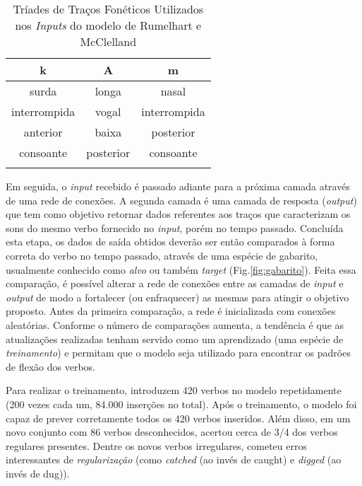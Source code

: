 \begin{table}[H]
\begin{center}
\begin{tabular}{ccc}
k                    & A                    & m                    \\ \hline
surda                & longa                & nasal                \\
interrompida         & vogal                & interrompida         \\
anterior             & baixa                & posterior            \\
consoante            & posterior            & consoante            \\
\multicolumn{1}{l}{} & \multicolumn{1}{l}{} & \multicolumn{1}{l}{}
\end{tabular}
\caption{Tríades de Traços Fonéticos Utilizados nos \textit{Inputs} do modelo de Rumelhart e McClelland}
\label{tab:trigrams}
\end{center}
\end{table}

Em seguida, o \textit{input} recebido é passado adiante para a próxima camada através de uma rede de conexões. A segunda camada é uma camada de resposta (\textit{output}) que tem como objetivo retornar dados referentes aos traços que caracterizam os sons do mesmo verbo fornecido no \textit{input}, porém no tempo passado. Concluída esta etapa, os dados de saída obtidos deverão ser então comparados à forma correta do verbo no tempo passado, através de uma espécie de gabarito, usualmente conhecido como \textit{alvo} ou também \textit{target} (Fig.\ref{fig:gabarito}). Feita essa comparação, é possível alterar a rede de conexões entre as camadas de \textit{input} e \textit{output} de modo a fortalecer (ou enfraquecer) as mesmas para atingir o objetivo proposto. Antes da primeira comparação, a rede é inicializada com conexões aleatórias. Conforme o número de comparações aumenta, a tendência é que as atualizações realizadas tenham servido como um aprendizado (uma espécie de \textit{treinamento}) e permitam que o modelo seja utilizado para encontrar os padrões de flexão dos verbos.



Para realizar o treinamento, \cite{rumelhart:1986} introduzem 420 verbos no modelo repetidamente (200 vezes cada um, 84.000 inserções no total).  Após o treinamento, o modelo foi capaz de prever corretamente todos os 420 verbos inseridos. Além disso, em um novo conjunto com 86 verbos desconhecidos, acertou cerca de 3/4 dos verbos regulares presentes. Dentre os novos verbos irregulares, cometeu erros interessantes de \textit{regularização} (como \textit{catched} (ao invés de caught) e \textit{digged} (ao invés de dug)). %

